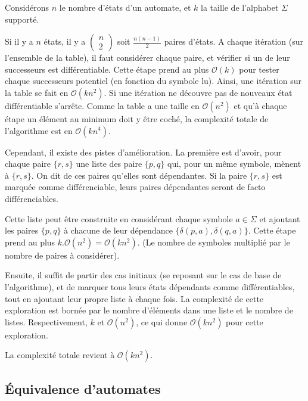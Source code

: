 	 \begin{complexity}
	 
	 Considérons $n$ le nombre d'états d'un automate, et $k$ la taille de l'alphabet $\Sigma$ supporté.
	 
	 Si il y a $n$ états, il y a $\begin{pmatrix}n\\2\end{pmatrix}$ soit $\frac{n(n-1)}{2}$ paires d'états. A chaque itération (sur l'ensemble de la table), il faut considérer chaque paire, et vérifier si un de leur successeurs est différentiable. Cette étape prend au plus $\mathcal{O}(k)$ pour tester chaque successeurs potentiel (en fonction du symbole lu).  Ainsi, une itération sur la table se fait en $\mathcal{O}(kn^2)$. Si une itération ne découvre pas de nouveaux état différentiable s'arrête. Comme la table a une taille en $\mathcal{O}(n^2)$ et qu'à chaque étape un élément au minimum doit y être coché, la complexité totale de l'algorithme est en $\mathcal{O}(kn^4)$.
	 
	 Cependant, il existe des pistes d'amélioration. La première est d'avoir, pour chaque paire $\{r,s\}$ une liste des paire $\{p,q\}$ qui, pour un même symbole, mènent à $\{r,s\}$. On dit de ces paires qu'elles sont dépendantes. Si la paire $\{r,s\}$ est marquée comme différenciable, leurs paires dépendantes seront de facto différenciables. 
	 
	 Cette liste peut être construite en considérant chaque symbole $a \in \Sigma$ et ajoutant les paires $\{p,q\}$ à chacune de leur dépendance $\{\delta(p,a),\delta(q,a)\}$. Cette étape prend au plus $k.\mathcal{O}(n^2)=\mathcal{O}(kn^2)$. (Le nombre de symboles multiplié par le nombre de paires à considérer).
	 
	 Ensuite, il suffit de partir des cas initiaux (se reposant sur le cas de base de l'algorithme), et de marquer tous leurs états dépendants comme différentiables, tout en ajoutant leur propre liste à chaque fois. La complexité de cette exploration est bornée par le nombre d'éléments dans une liste et le nombre de listes. Respectivement, $k$ et $\mathcal{O}(n^2)$, ce qui donne $\mathcal{O}(kn^2)$ pour cette exploration.
	 
	 La complexité totale revient à $\mathcal{O}(kn^2)$.
	 \end{complexity}
	 
	 
	 \subsection{Équivalence d'automates}\label{ss:eqauto}
	 
